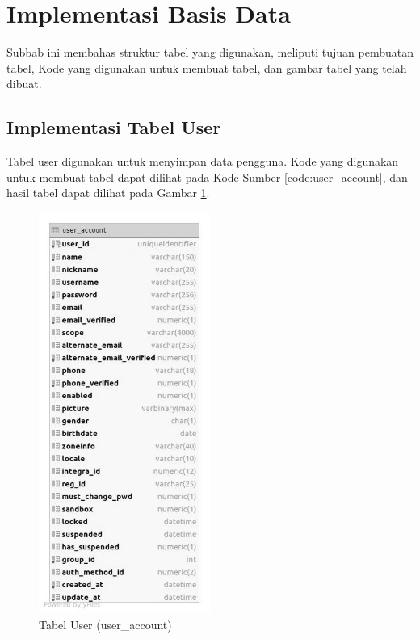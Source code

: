 \section{Implementasi Basis Data}
\par Subbab ini membahas struktur tabel yang digunakan, meliputi tujuan pembuatan tabel, Kode yang digunakan untuk membuat tabel, dan gambar tabel yang telah dibuat.

\subsection{Implementasi Tabel User}
\par Tabel user digunakan untuk menyimpan data pengguna. Kode yang digunakan untuk membuat tabel dapat dilihat pada Kode Sumber \ref{code:user_account}, dan hasil tabel dapat dilihat pada Gambar \ref{tabel_user_account}.

\begin{figure}[H]
    \centering\includegraphics[width=0.5\textwidth]{bab4/figures/tabel_user_account.jpg}
    \caption{Tabel User (user\_account)}
    \label{tabel_user_account}
\end{figure}

